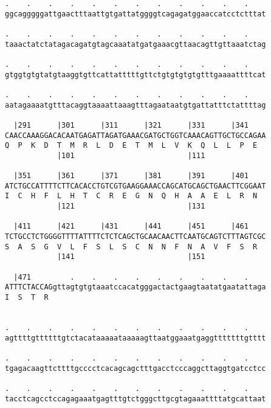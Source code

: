\documentclass{article}
\begin{document}
\begin{Verbatim}
.    .    .    .    .    .    .    .    .    .    .    .    
ggcagggggattgaactttaattgtgattatggggtcagagatggaaccatcctctttat
                                                            
.    .    .    .    .    .    .    .    .    .    .    .    
taaactatctatagacagatgtagcaaatatgatgaaacgttaacagttgttaaatctag
                                                            
.    .    .    .    .    .    .    .    .    .    .    .    
gtggtgtgtatgtaaggtgttcattatttttgttctgtgtgtgtgtttgaaaattttcat
                                                            
.    .    .    .    .    .    .    .    .    .    .    .    
aatagaaaatgtttacaggtaaaattaaagtttagaataatgtgattatttctattttag
                                                            
  |291      |301      |311      |321      |331      |341    
CAACCAAAGGACACAATGAGATTAGATGAAACGATGCTGGTCAAACAGTTGCTGCCAGAA
Q  P  K  D  T  M  R  L  D  E  T  M  L  V  K  Q  L  L  P  E  
            |101                          |111              
  
  |351      |361      |371      |381      |391      |401    
ATCTGCCATTTTCTTCACACCTGTCGTGAAGGAAACCAGCATGCAGCTGAACTTCGGAAT
I  C  H  F  L  H  T  C  R  E  G  N  Q  H  A  A  E  L  R  N  
            |121                          |131              
  
  |411      |421      |431      |441      |451      |461    
TCTGCCTCTGGGGTTTTATTTTCTCTCAGCTGCAACAACTTCAATGCAGTCTTTAGTCGC
S  A  S  G  V  L  F  S  L  S  C  N  N  F  N  A  V  F  S  R  
            |141                          |151              
  
  |471         .    .    .    .    .    .    .    .    .    
ATTTCTACCAGgttagtgtgtaaatccacatgggactactgaagtaatatgaatattaga
I  S  T  R                                                  
                                                            
  
.    .    .    .    .    .    .    .    .    .    .    .    
agttttgttttttgtctacataaaaataaaaagttaatggaaatgaggtttttttgtttt
                                                            
.    .    .    .    .    .    .    .    .    .    .    .    
tgagacaagttcttttgcccctcacagcagctttgacctcccaggcttaggtgatcctcc
                                                            
.    .    .    .    .    .    .    .    .    .    .    .    
tacctcagcctccagagaaatgagtttgtctgggcttgcgtagaaattttatgcattaat
                                                            

\end{Verbatim}
\end{document}
